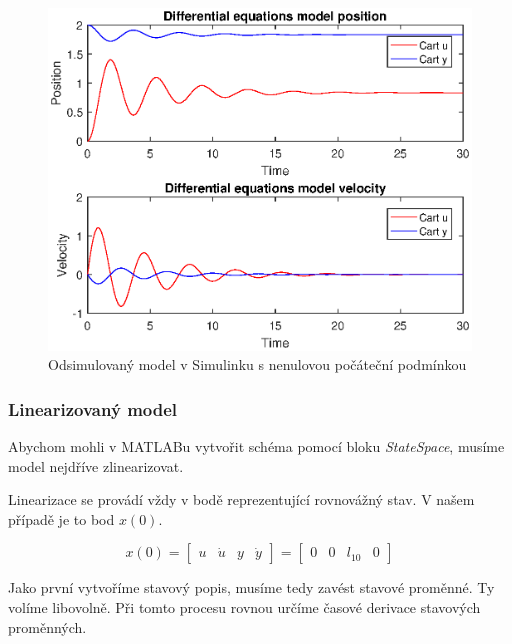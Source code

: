 \begin{figure}[htbp]
	\centering
	\includegraphics[scale=0.7]{graphs/equations.eps}
	\caption{Odsimulovaný model v Simulinku s nenulovou počáteční podmínkou}
\end{figure}
\FloatBarrier

\subsubsection{Linearizovaný model}

Abychom mohli v MATLABu vytvořit schéma pomocí bloku \textit{StateSpace}, musíme model nejdříve zlinearizovat.

Linearizace se provádí vždy v bodě reprezentující rovnovážný stav. V našem případě je to bod \( x(0) \).

\[ x(0) = \begin{bmatrix} u & \dot{u} & y & \dot{y} \end{bmatrix} = \begin{bmatrix} 0 & 0 & l_{10} & 0 \end{bmatrix} \]

Jako první vytvoříme stavový popis, musíme tedy zavést stavové proměnné. Ty volíme libovolně. Při tomto procesu rovnou určíme časové derivace stavových proměnných.

